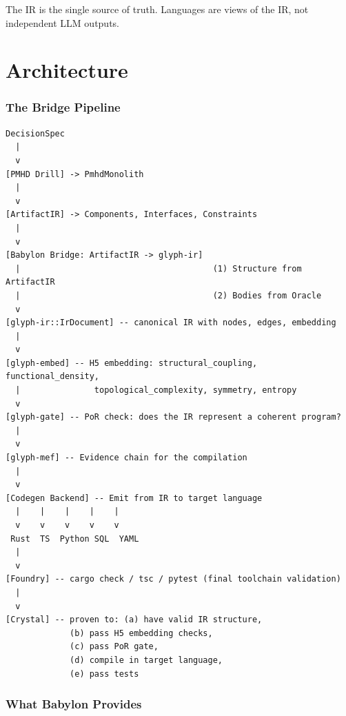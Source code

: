 \documentclass[11pt,a4paper,twoside]{article}
\theoremstyle{definition}
\theoremstyle{plain}
\theoremstyle{remark}
\begin{document}
The IR is the single source of truth. Languages are views of the IR,
not independent LLM outputs.


\part{Architecture}\label{part:arch}

\section{The Bridge Pipeline}\label{sec:pipeline}

\begin{lstlisting}[title={Complete Pipeline}]
DecisionSpec
  |
  v
[PMHD Drill] -> PmhdMonolith
  |
  v
[ArtifactIR] -> Components, Interfaces, Constraints
  |
  v
[Babylon Bridge: ArtifactIR -> glyph-ir]
  |                                       (1) Structure from ArtifactIR
  |                                       (2) Bodies from Oracle
  v
[glyph-ir::IrDocument] -- canonical IR with nodes, edges, embedding
  |
  v
[glyph-embed] -- H5 embedding: structural_coupling, functional_density,
  |               topological_complexity, symmetry, entropy
  v
[glyph-gate] -- PoR check: does the IR represent a coherent program?
  |
  v
[glyph-mef] -- Evidence chain for the compilation
  |
  v
[Codegen Backend] -- Emit from IR to target language
  |    |    |    |    |
  v    v    v    v    v
 Rust  TS  Python SQL  YAML
  |
  v
[Foundry] -- cargo check / tsc / pytest (final toolchain validation)
  |
  v
[Crystal] -- proven to: (a) have valid IR structure,
             (b) pass H5 embedding checks,
             (c) pass PoR gate,
             (d) compile in target language,
             (e) pass tests
\end{lstlisting}


\section{What Babylon Provides}\label{sec:babylonprovides}
\end{document}
